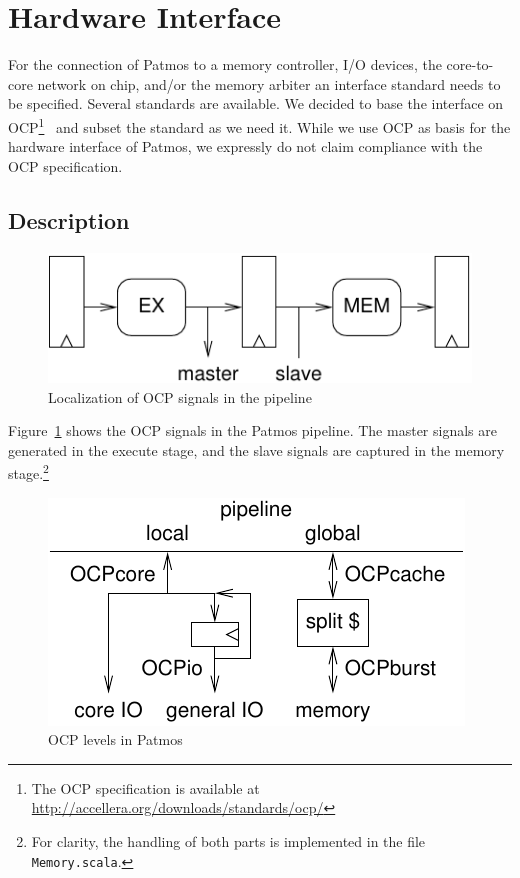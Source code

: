 \documentclass[a4paper,fontsize=10pt,twoside,DIV15,BCOR12mm,headinclude=true,footinclude=false,pagesize,bibtotoc]{scrbook}
\newcommand{\code}[1]{{\texttt{#1}}}
\begin{document}
\section{Hardware Interface}

For the connection of Patmos to a memory controller, I/O devices, the
core-to-core network on chip, and/or the memory arbiter an interface
standard needs to be specified. Several standards are available.  We
decided to base the interface on OCP\footnote{The OCP specification is
  available at \url{http://accellera.org/downloads/standards/ocp/}}~\cite{ocp:spec}
and subset the standard as we need it. While we use OCP as basis for
the hardware interface of Patmos, we expressly do not claim
compliance with the OCP specification.

\subsection{Description}

\begin{figure}
  \centering
  \includegraphics[scale=.8]{fig/ocppipe}
  \caption{Localization of OCP signals in the pipeline}
  \label{fig:ocppipe}
\end{figure}

Figure~\ref{fig:ocppipe} shows the OCP signals in the Patmos
pipeline. The master signals are generated in the execute stage, and
the slave signals are captured in the memory stage.\footnote{For
  clarity, the handling of both parts is implemented in the file
  \code{Memory.scala}.}

\begin{figure}
  \centering
  \includegraphics[scale=.8]{fig/ocplevels}
  \caption{OCP levels in Patmos}
  \label{fig:ocplevels}
\end{figure}
\end{document}
